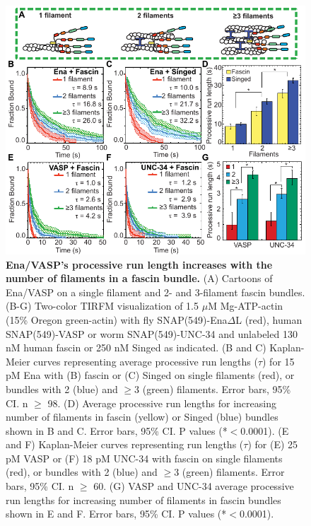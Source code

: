 \begin{figure}
\centering
\includegraphics[width=\textwidth]{img/ch02/Figure_2_elife.pdf}
\caption[Ena/VASP's processive run length increases with the number of filaments in a fascin bundle.]{\textbf{Ena/VASP's processive run length increases with the number of filaments in a fascin bundle.} (A) Cartoons of Ena/VASP on a single filament and 2- and 3-filament fascin bundles. (B-G) Two-color TIRFM visualization of 1.5 $\mu$M Mg-ATP-actin (15\% Oregon green-actin) with fly SNAP(549)-Ena$\Delta$L (red), human SNAP(549)-VASP or worm SNAP(549)-UNC-34 and unlabeled 130 nM human fascin or 250 nM Singed as indicated. (B and C) Kaplan-Meier curves representing average processive run lengths ($\tau$) for 15 pM Ena with (B) fascin or (C) Singed on single filaments (red), or bundles with 2 (blue) and $\geq$3 (green)  filaments. Error bars, 95\% CI. n $\geq$ 98. (D) Average processive run lengths for increasing number of filaments in fascin (yellow) or Singed (blue) bundles shown in B and C. Error bars, 95\% CI. P values (*$<$0.0001). (E and F) Kaplan-Meier curves representing run lengths ($\tau$) for (E) 25 pM VASP or (F) 18 pM UNC-34 with fascin on single filaments (red), or bundles with 2 (blue) and $\geq$3 (green) filaments. Error bars, 95\% CI. n $\geq$ 60. (G) VASP and UNC-34 average processive run lengths for increasing number of filaments in fascin bundles shown in E and F. Error bars, 95\% CI. P values (*$<$0.0001).}
\label{fig:ena-filaments}
\end{figure}

